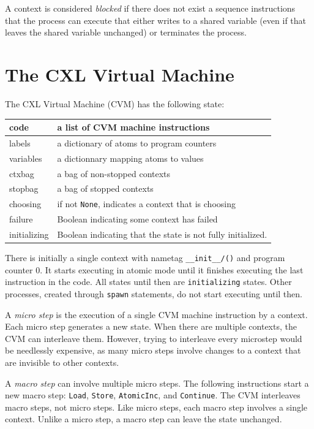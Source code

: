 \documentclass{report}
\begin{document}
A context is considered \emph{blocked}
if there does not exist a
sequence instructions that the process can execute that either writes
to a shared variable (even if that leaves the shared variable unchanged)
or terminates the process.

\chapter{The CXL Virtual Machine}

The CXL Virtual Machine (CVM) has the following state:

\vspace{1em}
\begin{tabular}{|l|l|}
\hline
code & a list of CVM machine instructions \\
\hline
labels & a dictionary of atoms to program counters \\
\hline
variables & a dictionnary mapping atoms to values \\
\hline
ctxbag & a bag of non-stopped contexts \\
\hline
stopbag & a bag of stopped contexts \\
\hline
choosing & if not \texttt{None}, indicates a context that is choosing \\
\hline
failure & Boolean indicating some context has failed \\
\hline
initializing & Boolean indicating that the state is not fully initialized. \\
\hline
\end{tabular}
\vspace{1em}

There is initially a single context with nametag
\texttt{\_\_init\_\_/()} and program counter 0.  It starts executing
in atomic mode until it finishes executing the last instruction in
the code.  All states until then are \texttt{initializing} states.
Other processes, created through \texttt{spawn} statements, do not
start executing until then.

A \emph{micro step}
is the execution of a single CVM machine instruction
by a context.
Each micro step generates a new state.
When there are multiple contexts, the CVM can interleave them.
However, trying to interleave every microstep would be needlessly expensive,
as many micro steps involve changes to a context that are invisible to
other contexts.

A \emph{macro step}
can involve multiple micro steps.  The following
instructions start a new macro step: \texttt{Load}, \texttt{Store},
\texttt{AtomicInc}, and \texttt{Continue}.  The CVM
interleaves macro steps, not micro steps.  Like micro steps, each
macro step involves a single context.  Unlike a micro step, a macro
step can leave the state unchanged.
\end{document}
